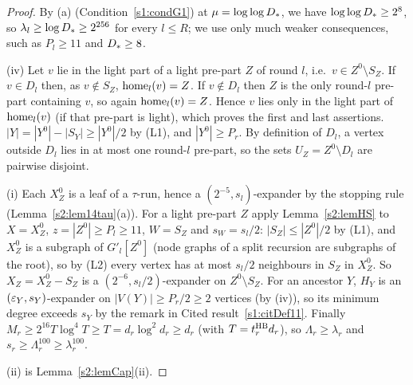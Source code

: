\begin{proof}
By (a) (Condition~\ref{s1:condG1}) at $\mu=\log\log D_{*}$, we have
$\log\log D_{*}\ge2^8$, so $\lambda_l\ge\log D_{*}\ge2^{256}$ for every $l\le R$;
we use only much weaker consequences, such as $P_l\ge11$ and $D_{*}\ge8$.

(iv) Let $v$ lie in the light part of a light pre-part $Z$ of round $l$, i.e.\
$v\in Z^0\setminus S_Z$. If $v\in D_l$ then, as $v\notin S_Z$,
$\mathrm{home}_l(v)=Z$. If $v\notin D_l$ then $Z$ is the only round-$l$ pre-part
containing $v$, so again $\mathrm{home}_l(v)=Z$. Hence $v$ lies only in the light part
of $\mathrm{home}_l(v)$ (if that pre-part is light), which proves the first and last
assertions. $|Y|=|Y^0|-|S_Y|\ge|Y^0|/2$ by (L1), and $|Y^0|\ge P_r$. By
definition of $D_l$, a vertex outside $D_l$ lies in at most one round-$l$
pre-part, so the sets $U_Z=Z^0\setminus D_l$ are pairwise disjoint.

(i) Each $X^0_Z$ is a leaf of a $\tau$-run, hence a $(2^{-5},s_l)$-expander by
the stopping rule (Lemma~\ref{s2:lem14tau}(a)). For a light pre-part $Z$ apply
Lemma~\ref{s2:lemHS} to $X=X^0_Z$, $z=|Z^0|\ge P_l\ge11$, $W=S_Z$ and
$s_W=s_l/2$: $|S_Z|\le|Z^0|/2$ by (L1), and $X^0_Z$ is a subgraph of
$G'_l[Z^0]$ (node graphs of a split recursion are subgraphs of the root), so by
(L2) every vertex has at most $s_l/2$ neighbours in $S_Z$ in $X^0_Z$. So
$X_Z=X^0_Z-S_Z$ is a $(2^{-6},s_l/2)$-expander on $Z^0\setminus S_Z$. For an
ancestor $Y$, $H_Y$ is an $(\varepsilon_Y,s_Y)$-expander on $|V(Y)|\ge P_r/2\ge2$
vertices (by (iv)), so its minimum degree exceeds $s_Y$ by the remark in Cited
result~\ref{s1:citDef11}. Finally $M_r\ge2^{16}T\log^4T\ge T=d_r\log^2d_r\ge d_r$
(with $T=t^{\mathrm{HB}}_rd_r$), so $\Lambda_r\ge\lambda_r$ and
$s_r\ge\Lambda_r^{100}\ge\lambda_r^{100}$.

(ii) is Lemma~\ref{s2:lemCap}(ii).


\end{proof}

